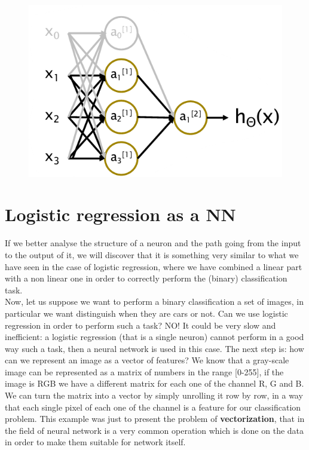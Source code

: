 \begin{figure}[h]
    \centering
    \includegraphics[scale=0.6]{img/neuron_spec.png}
\end{figure}

\section{Logistic regression as a NN}
If we better analyse the structure of a neuron and the path going from the input to the output of it, we will discover that it is something very similar to what we have seen in the case of logistic regression, where we have combined a linear part with a non linear one in order to correctly perform the (binary) classification task.\\
Now, let us suppose we want to perform a binary classification a set of images, in particular we want distinguish when they are cars or not. Can we use logistic regression in order to perform such a task? NO! It could be very slow and inefficient: a logistic regression (that is a single neuron) cannot perform in a good way such a task, then a neural network is used in this case. The next step is: how can we represent an image as a vector of features? We know that a gray-scale image can be represented as a matrix of numbers in the range [0-255], if the image is RGB we have a different matrix for each one of the channel R, G and B. We can turn the matrix into a vector by simply unrolling it row by row, in a way that each single pixel of each one of the channel is a feature for our classification problem. This example was just to present the problem of \textbf{vectorization}, that in the field of neural network is a very common operation which is done on the data in order to make them suitable for network itself.\\

